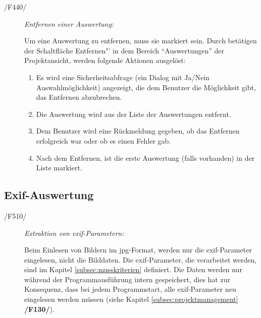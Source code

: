 \begin{description}
		\item[/F440/] \textit{Entfernen einer Auswertung:}\par Um eine Auswertung zu entfernen, muss sie markiert sein. Durch betätigen der Schaltfläche Entfernen"' in dem Bereich "`Auswertungen"' der Projektansicht, werden folgende Aktionen ausgelöst:

			\begin{enumerate}

				\item Es wird eine Sicherheitsabfrage (ein Dialog mit Ja/Nein Auswahlmöglichkeit) angezeigt, die dem Benutzer die Möglichkeit gibt, das Entfernen abzubrechen.

				\item Die Auswertung wird aus der Liste der Auswertungen entfernt.

				\item Dem Benutzer wird eine Rückmeldung gegeben, ob das Entfernen erfolgreich war oder ob es einen Fehler gab.

				\item Nach dem Entfernen, ist die erste Auswertung (falls vorhanden) in der Liste markiert.

			\end{enumerate}
			
	\end{description}

\subsection{Exif-Auswertung}

	\begin{description}

		\item[/F510/] \textit{Extraktion von \gls{exif}-Parametern:}\par Beim Einlesen von Bildern im \gls{jpg}-Format, werden nur die \gls{exif}-Parameter eingelesen, nicht die Bilddaten. Die \gls{exif}-Parameter, die verarbeitet werden, sind im Kapitel \ref{subsec:musskriterien} definiert. Die Daten werden nur während der Programmausführung intern gespeichert, dies hat zur Konsequenz, dass bei jedem Programmstart, alle \gls{exif}-Parameter neu eingelesen werden müssen (siehe Kapitel \ref{subsec:projektmanagement} \textbf{/F130/}).
	
	\end{description}